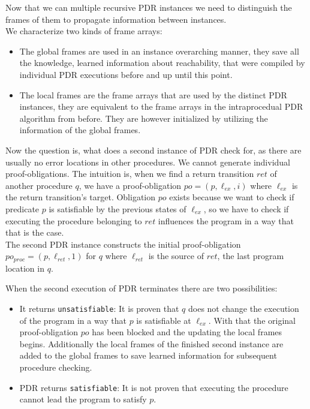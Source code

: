 \documentclass{article}
\begin{document}
	Now that we can multiple recursive PDR instances we need to distinguish the frames of them to propagate information between instances. \\ We characterize two kinds of frame arrays:
	\begin{itemize}
		\item The global frames are used in an instance overarching manner, they save all the knowledge, learned information about reachability, that were compiled by individual PDR executions before and up until this point. 
		\item The local frames are the frame arrays that are used by the distinct PDR instances, they are equivalent to the frame arrays in the intraprocedual PDR algorithm from before. They are however initialized by utilizing the information of the global frames.
	\end{itemize}
	Now the question is, what does a second instance of PDR check for, as there are usually no error locations in other procedures. We cannot generate individual proof-obligations.
	The intuition is, when we find a return transition $ret$ of another procedure $q$, we have a proof-obligation $po = (p, \ell_{ex}, i)$ where $\ell_{ex}$ is the return transition's target. Obligation $po$ exists because we want to check if predicate $p$ is satisfiable by the previous states of $\ell_{ex}$, so we have to check if executing the procedure belonging to $ret$ influences the program in a way that that is the case. \\ The second PDR instance constructs the initial proof-obligation $po_{proc} = (p, \ell_{ret}, 1)$ for $q$ where $\ell_{ret}$ is the source of $ret$, the last program location in $q$. \\ \par
	When the second execution of PDR terminates there are two possibilities: 
	\begin{itemize}
		\item It returns \texttt{unsatisfiable}: It is proven that $q$ does not change the execution of the program in a way that $p$ is satisfiable at $\ell_{ex}$. With that the original proof-obligation $po$ has been blocked and the updating the local frames begins. Additionally the local frames of the finished second instance are added to the global frames to save learned information for subsequent procedure checking.
		\item PDR returns \texttt{satisfiable}: It is not proven that executing the procedure cannot lead the program to satisfy $p$. 
	\end{itemize}
\end{document}
